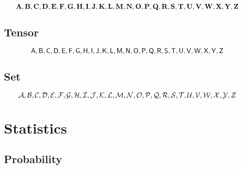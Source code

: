 \documentclass[a4paper,11pt]{article}
\begin{document}
\begin{equation*}
\mathbf{A}, \mathbf{B}, \mathbf{C}, \mathbf{D}, \mathbf{E}, \mathbf{F}, \mathbf{G}, \mathbf{H}, \mathbf{I}, \mathbf{J}, \mathbf{K}, \mathbf{L}, \mathbf{M}, \mathbf{N}, \mathbf{O}, \mathbf{P}, \mathbf{Q}, \mathbf{R}, \mathbf{S}, \mathbf{T}, \mathbf{U}, \mathbf{V}, \mathbf{W}, \mathbf{X}, \mathbf{Y}, \mathbf{Z}
\end{equation*}


\subsection{Tensor}
\label{sub:tensor}

\begin{equation*}
\mathsf{A}, \mathsf{B}, \mathsf{C}, \mathsf{D}, \mathsf{E}, \mathsf{F}, \mathsf{G}, \mathsf{H}, \mathsf{I}, \mathsf{J}, \mathsf{K}, \mathsf{L}, \mathsf{M}, \mathsf{N}, \mathsf{O}, \mathsf{P}, \mathsf{Q}, \mathsf{R}, \mathsf{S}, \mathsf{T}, \mathsf{U}, \mathsf{V}, \mathsf{W}, \mathsf{X}, \mathsf{Y}, \mathsf{Z}
\end{equation*}

\subsection{Set}
\label{sub:set}

\begin{equation*}
\mathcal{A}, \mathcal{B}, \mathcal{C}, \mathcal{D}, \mathcal{E}, \mathcal{F}, \mathcal{G}, \mathcal{H}, \mathcal{I}, \mathcal{J}, \mathcal{K}, \mathcal{L}, \mathcal{M}, \mathcal{N}, \mathcal{O}, \mathcal{P}, \mathcal{Q}, \mathcal{R}, \mathcal{S}, \mathcal{T}, \mathcal{U}, \mathcal{V}, \mathcal{W}, \mathcal{X}, \mathcal{Y}, \mathcal{Z}
\end{equation*}

\section{Statistics}
\label{sec:statistics}

\subsection{Probability} %
\label{sub:probability}
\end{document}
